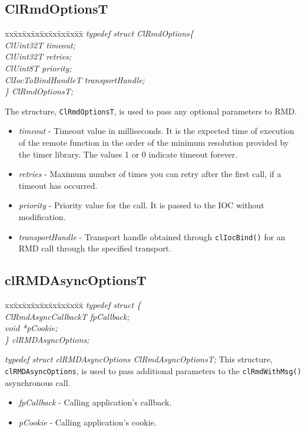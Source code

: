 \begin{flushleft}
\subsection{ClRmdOptionsT}
\begin{tabbing}
xx\=xx\=xx\=xx\=xx\=xx\=xx\=xx\=xx\=\kill
\textit{typedef struct ClRmdOptions\{}\\
\>\>\>\>\textit{ClUint32T timeout;}\\
\>\>\>\>\textit{ClUint32T retries;}\\
\>\>\>\>\textit{ClUint8T priority;}\\
\>\>\>\>\textit{ClIocToBindHandleT transportHandle;}\\
\textit{\} ClRmdOptionsT;}\end{tabbing}
 The structure, {\tt{ClRmdOptionsT}}, is used to pass any optional parameters to RMD.
\begin{itemize}
\item
\textit{timeout} - Timeout value in milliseconds. It is the expected time of execution of the remote function in the order of the minimum resolution 
provided by the timer library. The values 1 or 0 indicate timeout forever.
\item
\textit{retries} - Maximum number of times you can retry after the first call, if a timeout has occurred.
\item
\textit{priority} - Priority value for the call. It is passed to the IOC without modification.
\item
\textit{transportHandle} - Transport handle obtained through {\tt{clIocBind()}} for an RMD call through the specified transport. 
\end{itemize}


\subsection{clRMDAsyncOptionsT}
\begin{tabbing}
xx\=xx\=xx\=xx\=xx\=xx\=xx\=xx\=xx\=\kill
\textit{typedef struct \{}\\
\>\>\>\>\textit{ClRmdAsyncCallbackT fpCallback;}\\
\>\>\>\>\textit{void *pCookie;}\\
\textit{\} clRMDAsyncOptions;}\end{tabbing}
\textit{typedef struct clRMDAsyncOptions ClRmdAsyncOptionsT;}
\newline
\newline
This structure, {\tt{clRMDAsyncOptions}}, is used to pass additional parameters to the {\tt{clRmdWithMsg()}} asynchronous call.
\begin{itemize}
\item
\textit{fpCallback} - Calling application's callback.
\item
\textit{pCookie} - Calling application's cookie.
\end{itemize}



\end{flushleft}

